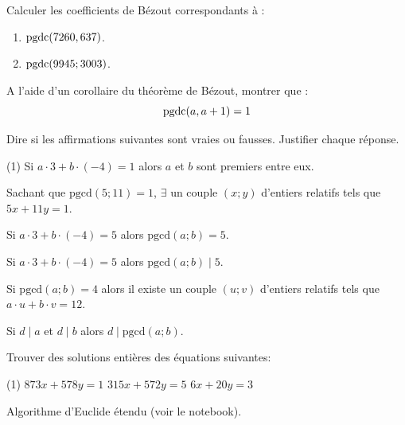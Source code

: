 \medskip
\begin{exstheorie}
\exo
Calculer les coefficients de Bézout correspondants à :
\begin{enumerate}[label=\alph*), left=0mm,itemsep=2mm]
\item $\textrm{pgdc}(7260,637)$.
\item $\textrm{pgdc}(9945;3003)$. 
\end{enumerate}




\eexo





\exo
A l'aide d'un corollaire du théorème de Bézout, montrer que :
$$\textrm{pgdc}(a,a+1)=1$$



\eexo

\exo
Dire si les affirmations suivantes sont vraies ou fausses. Justifier chaque réponse. 

\begin{tasks}[after-item-skip=2mm,item-indent=5mm,column-sep=1mm,label-offset=1mm](1)
	\task Si $a \cdot 3 + b \cdot (-4) = 1$ alors $a$ et $b$ sont premiers entre eux.
	
	\task Sachant que $\text{pgcd}(5;11) = 1$, $\exists$ un couple $(x; y)$ d'entiers relatifs tels que $5x + 11y = 1$.
	
	\task Si $a \cdot 3 + b \cdot (-4) = 5$ alors $\text{pgcd}(a;b) = 5$.
	
	\task Si $a \cdot 3 + b \cdot (-4) = 5$ alors $\text{pgcd}(a;b) \mid 5$.
	
	\task Si $\text{pgcd}(a;b) = 4$ alors il existe un couple $(u; v)$ d'entiers relatifs tels que $a \cdot u + b \cdot v = 12$.
	
	\task Si $d \mid a$ et $d \mid b$ alors $d \mid \text{pgcd}(a;b)$.
\end{tasks}


\eexo

\exo

Trouver des solutions entières des équations suivantes:

\begin{tasks}[after-item-skip=2mm,item-indent=5mm,column-sep=1mm,label-offset=1mm](1)
	\task $873x+578y=1$
	\task $315x+572y=5$
	\task $6x+20y=3$
\end{tasks}

\columnbreak



\exordi Algorithme d'Euclide étendu  (voir le notebook).


\end{exstheorie}
